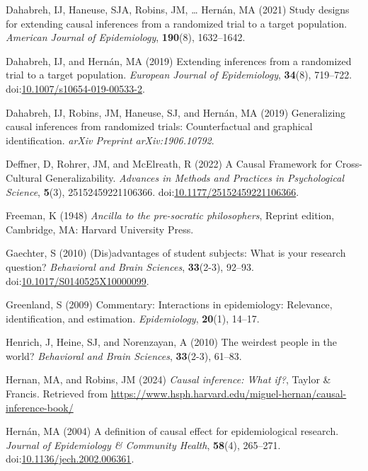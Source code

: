 \documentclass[
  single column]{article}
\newlength{\cslhangindent}
\newenvironment{CSLReferences}[2] %
 {\begin{list}{}{%
  \setlength{\itemindent}{0pt}
  \setlength{\leftmargin}{0pt}
  \setlength{\parsep}{0pt}
  \ifodd #1
   \setlength{\leftmargin}{\cslhangindent}
   \setlength{\itemindent}{-1\cslhangindent}
  \fi
  \setlength{\itemsep}{#2\baselineskip}}}
 {\end{list}}
\begin{document}
\begin{CSLReferences}{1}{0}
Dahabreh, IJ, Haneuse, SJA, Robins, JM, \ldots{} Hernán, MA (2021) Study
designs for extending causal inferences from a randomized trial to a
target population. \emph{American Journal of Epidemiology},
\textbf{190}(8), 1632--1642.

Dahabreh, IJ, and Hernán, MA (2019) Extending inferences from a
randomized trial to a target population. \emph{European Journal of
Epidemiology}, \textbf{34}(8), 719--722.
doi:\href{https://doi.org/10.1007/s10654-019-00533-2}{10.1007/s10654-019-00533-2}.

Dahabreh, IJ, Robins, JM, Haneuse, SJ, and Hernán, MA (2019)
Generalizing causal inferences from randomized trials: Counterfactual
and graphical identification. \emph{arXiv Preprint arXiv:1906.10792}.

Deffner, D, Rohrer, JM, and McElreath, R (2022) A Causal Framework for
Cross-Cultural Generalizability. \emph{Advances in Methods and Practices
in Psychological Science}, \textbf{5}(3), 25152459221106366.
doi:\href{https://doi.org/10.1177/25152459221106366}{10.1177/25152459221106366}.

Freeman, K (1948) \emph{Ancilla to the pre-socratic philosophers},
Reprint edition, Cambridge, MA: Harvard University Press.

Gaechter, S (2010) (Dis)advantages of student subjects: What is your
research question? \emph{Behavioral and Brain Sciences},
\textbf{33}(2-3), 92--93.
doi:\href{https://doi.org/10.1017/S0140525X10000099}{10.1017/S0140525X10000099}.

Greenland, S (2009) Commentary: Interactions in epidemiology: Relevance,
identification, and estimation. \emph{Epidemiology}, \textbf{20}(1),
14--17.

Henrich, J, Heine, SJ, and Norenzayan, A (2010) The weirdest people in
the world? \emph{Behavioral and Brain Sciences}, \textbf{33}(2-3),
61--83.

Hernan, MA, and Robins, JM (2024) \emph{Causal inference: What if?},
Taylor \& Francis. Retrieved from
\url{https://www.hsph.harvard.edu/miguel-hernan/causal-inference-book/}

Hernán, MA (2004) A definition of causal effect for epidemiological
research. \emph{Journal of Epidemiology \& Community Health},
\textbf{58}(4), 265--271.
doi:\href{https://doi.org/10.1136/jech.2002.006361}{10.1136/jech.2002.006361}.


\end{CSLReferences}
\end{document}

